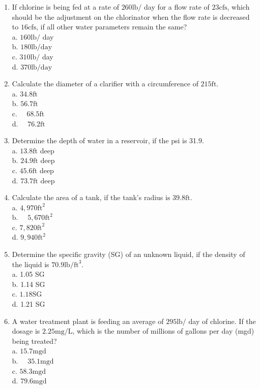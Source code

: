 \documentclass[10pt]{article}
\begin{document}
\begin{enumerate}
  \item If chlorine is being fed at a rate of $260 \mathrm{lb} /$ day for a flow rate of $23 \mathrm{cfs}$, which should be the adjustment on the chlorinator when the flow rate is decreased to $16 \mathrm{cfs}$, if all other water parameters remain the same?\\
a. $160 \mathrm{lb} /$ day\\
b. $180 \mathrm{lb} / \mathrm{day}$\\
c. $310 \mathrm{lb} /$ day\\
d. $370 \mathrm{lb} / \mathrm{day}$

  \item Calculate the diameter of a clarifier with a circumference of $215 \mathrm{ft}$.\\
a. $34.8 \mathrm{ft}$\\
b. $56.7 \mathrm{ft}$\\
c. $\quad 68.5 \mathrm{ft}$\\
d. $\quad 76.2 \mathrm{ft}$

  \item Determine the depth of water in a reservoir, if the psi is 31.9.\\
a. $13.8 \mathrm{ft}$ deep\\
b. $24.9 \mathrm{ft}$ deep\\
c. $45.6 \mathrm{ft}$ deep\\
d. $73.7 \mathrm{ft}$ deep

  \item Calculate the area of a tank, if the tank's radius is $39.8 \mathrm{ft}$.\\
a. $4,970 \mathrm{ft}^{2}$\\
b. $\quad 5,670 \mathrm{ft}^{2}$\\
c. $7,820 \mathrm{ft}^{2}$\\
d. $9,940 \mathrm{ft}^{2}$

  \item Determine the specific gravity (SG) of an unknown liquid, if the density of the liquid is $70.9 \mathrm{lb} / \mathrm{ft}^{3}$.\\
a. 1.05 SG\\
b. 1.14 SG\\
c. $1.18 \mathrm{SG}$\\
d. 1.21 SG

  \item A water treatment plant is feeding an average of $295 \mathrm{lb} /$ day of chlorine. If the dosage is $2.25 \mathrm{mg} / \mathrm{L}$, which is the number of millions of gallons per day (mgd) being treated?\\
a. $15.7 \mathrm{mgd}$\\
b. $\quad 35.1 \mathrm{mgd}$\\
c. $58.3 \mathrm{mgd}$\\
d. $79.6 \mathrm{mgd}$


\end{enumerate}
\end{document}
